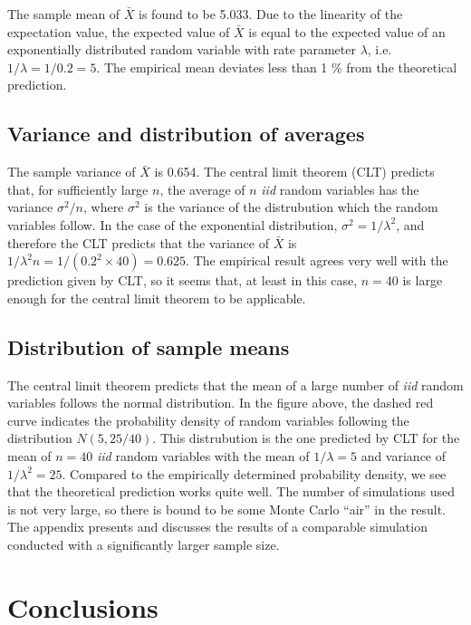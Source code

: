 \documentclass[12pt,a4paper]{article}
\begin{document}
The sample mean of \(\bar{X}\) is found to be 5.033. Due to the
linearity of the expectation value, the expected value of \(\bar{X}\) is
equal to the expected value of an exponentially distributed random
variable with rate parameter \(\lambda\), i.e.
\(1/\lambda = 1/0.2 = 5\). The empirical mean deviates less than 1 \%
from the theoretical prediction.

\subsection{Variance and distribution of
averages}\label{variance-and-distribution-of-averages}

The sample variance of \(\bar{X}\) is 0.654. The central limit theorem
(CLT) predicts that, for sufficiently large \(n\), the average of \(n\)
\emph{iid} random variables has the variance \(\sigma^2/n\), where
\(\sigma^2\) is the variance of the distrubution which the random
variables follow. In the case of the exponential distribution,
\(\sigma^2 = 1/\lambda^2\), and therefore the CLT predicts that the
variance of \(\bar{X}\) is
\(1/\lambda^2 n = 1/(0.2^2 \times 40) = 0.625\). The empirical result
agrees very well with the prediction given by CLT, so it seems that, at
least in this case, \(n = 40\) is large enough for the central limit
theorem to be applicable.

\subsection{Distribution of sample
means}\label{distribution-of-sample-means}

The central limit theorem predicts that the mean of a large number of
\emph{iid} random variables follows the normal distribution. In the
figure above, the dashed red curve indicates the probability density of
random variables following the distribution \(N(5, 25/40)\). This
distrubution is the one predicted by CLT for the mean of \(n = 40\)
\emph{iid} random variables with the mean of \(1/\lambda = 5\) and
variance of \(1/\lambda^2 = 25\). Compared to the empirically determined
probability density, we see that the theoretical prediction works quite
well. The number of simulations used is not very large, so there is
bound to be some Monte Carlo ``air'' in the result. The appendix
presents and discusses the results of a comparable simulation conducted
with a significantly larger sample size.

\section{Conclusions}\label{conclusions}
\end{document}

